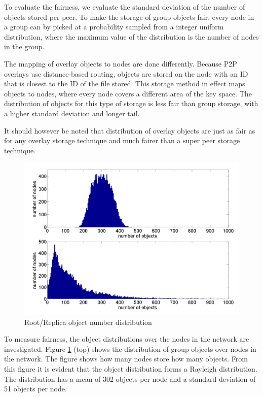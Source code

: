 \documentclass[10pt,a4paper,conference]{IEEEtran}
\begin{document}
To evaluate the fairness, we evaluate the standard deviation of the number of objects stored per peer. To make the storage of group objects fair,
every node in a group can by picked at a probability sampled from a integer uniform distribution, where the maximum value of the distribution is the
number of nodes in the group.

The mapping of overlay objects to nodes are done differently. Because P2P overlays use distance-based routing, objects are stored on the node with an
ID that is closest to the ID of the file stored. This storage method in effect maps objects to nodes, where every node covers a different area of the
key space. The distribution of objects for this type of storage is less fair than group storage, with a higher standard deviation and longer tail.

It should however be noted that distribution of overlay objects are just as fair as for any overlay storage technique and much fairer than a super
peer storage technique.

\begin{figure}[htbp]
 \centering
 \includegraphics[clip=true, viewport=1cm 0.5cm 28.5cm 20cm, width=\columnwidth]{RootRepOverlayObjects}
 \caption{Root/Replica object number distribution}
 \label{fig_group_overlay_objects}
\end{figure}
%
%
To measure fairness, the object distributions over the nodes in the network are investigated. Figure \ref{fig_group_overlay_objects} (top) shows the
distribution of group objects over nodes in the network. The figure shows how many nodes store how many objects. From this figure it is evident that
the object distribution forms a Rayleigh distribution. The distribution has a mean of 302 objects per node and a standard deviation of 51 objects per
node.
\end{document}
